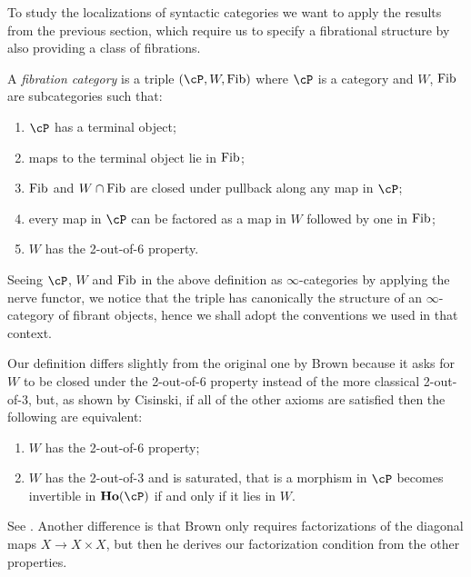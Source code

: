 \noindent
To study the localizations of syntactic categories we want to apply
the results from the previous section, which require us to specify a
fibrational structure by also providing a class
of fibrations.

\begin{defn}\label{fibcats}
  A \emph{fibration category} is a triple $(\cP,W,\fib)$ where $\cP$ is a
  category and $W$, $\operatorname{Fib}$ are subcategories such that:
  \begin{enumerate}
    \item $\cP$ has a terminal object;
    \item maps to the terminal object lie in $\operatorname{Fib}$;
    \item $\operatorname{Fib}$ and $W\cap \operatorname{Fib}$ are closed under pullback along any map in $\cP$;
    \item every map in $\cP$ can be factored as a map in $W$ followed by one in
      $\operatorname{Fib}$;
    \item $W$ has the 2-out-of-6 property.
  \end{enumerate}
\end{defn}

\begin{rmk}
  Seeing $\cP$, $W$ and $\operatorname{Fib}$ in the above definition as $\infty$-categories by
  applying the nerve functor, we
  notice that the triple has canonically the structure of an $\infty$-category
  of fibrant objects, hence we shall adopt the conventions we used in that
  context.
\end{rmk}

\begin{rmk}
  Our definition differs slightly from the original one by Brown
  because it asks for $W$ to be closed under the 2-out-of-6 property
  instead of the more classical 2-out-of-3, but, as shown by
  Cisinski, if all of
  the other axioms are satisfied then the following are equivalent:
  \begin{enumerate}
    \item $W$ has the 2-out-of-6 property;
    \item $W$ has the 2-out-of-3 and is saturated, that is a morphism in $\cP$
      becomes invertible in $\ho(\cP)$ if and only if it lies in $W$.
  \end{enumerate}
  See \cite[Thm.~7.2.7]{RB06}. Another difference is that Brown only requires
  factorizations of the diagonal maps $X\rightarrow X\times X$, but then he
  derives our factorization condition from the other properties.
\end{rmk}

